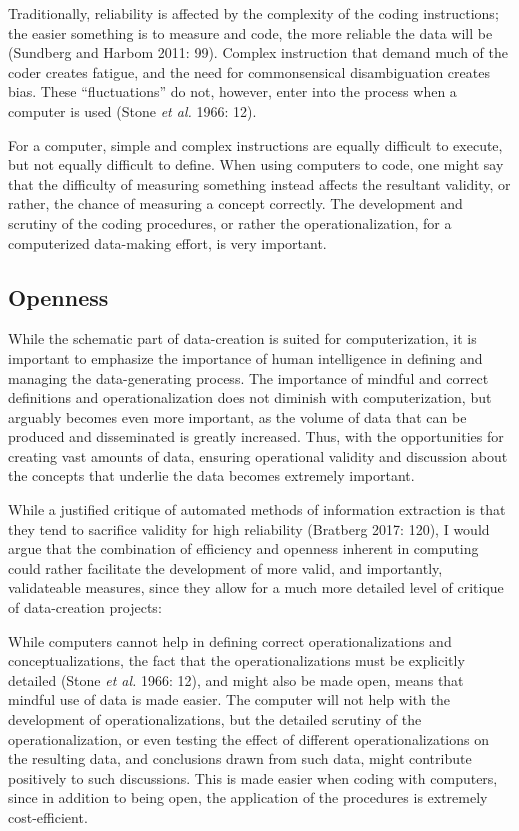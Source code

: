 \documentclass[12pt,twoside]{reedthesis}
\begin{document}
Traditionally, reliability is affected by the complexity of the coding
instructions; the easier something is to measure and code, the more
reliable the data will be (Sundberg and Harbom 2011: 99). Complex
instruction that demand much of the coder creates fatigue, and the need
for commonsensical disambiguation creates bias. These ``fluctuations''
do not, however, enter into the process when a computer is used (Stone
\emph{et al.} 1966: 12).

For a computer, simple and complex instructions are equally difficult to
execute, but not equally difficult to define. When using computers to
code, one might say that the difficulty of measuring something instead
affects the resultant validity, or rather, the chance of measuring a
concept correctly. The development and scrutiny of the coding
procedures, or rather the operationalization, for a computerized
data-making effort, is very important.

\subsection{Openness}\label{openness}

While the schematic part of data-creation is suited for computerization,
it is important to emphasize the importance of human intelligence in
defining and managing the data-generating process. The importance of
mindful and correct definitions and operationalization does not diminish
with computerization, but arguably becomes even more important, as the
volume of data that can be produced and disseminated is greatly
increased. Thus, with the opportunities for creating vast amounts of
data, ensuring operational validity and discussion about the concepts
that underlie the data becomes extremely important.

While a justified critique of automated methods of information
extraction is that they tend to sacrifice validity for high reliability
(Bratberg 2017: 120), I would argue that the combination of efficiency
and openness inherent in computing could rather facilitate the
development of more valid, and importantly, validateable measures, since
they allow for a much more detailed level of critique of data-creation
projects:

While computers cannot help in defining correct operationalizations and
conceptualizations, the fact that the operationalizations must be
explicitly detailed (Stone \emph{et al.} 1966: 12), and might also be
made open, means that mindful use of data is made easier. The computer
will not help with the development of operationalizations, but the
detailed scrutiny of the operationalization, or even testing the effect
of different operationalizations on the resulting data, and conclusions
drawn from such data, might contribute positively to such discussions.
This is made easier when coding with computers, since in addition to
being open, the application of the procedures is extremely
cost-efficient.
\end{document}
